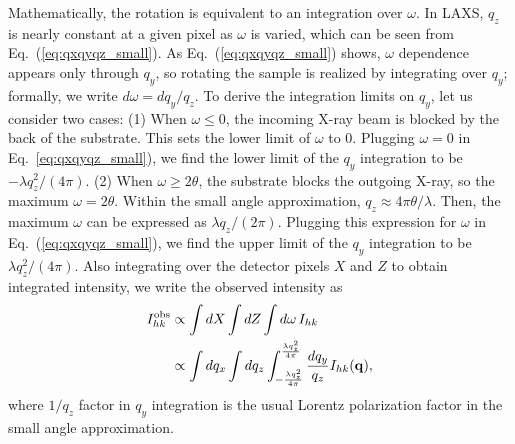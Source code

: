 Mathematically, the rotation is  
equivalent to an integration over $\omega$. In LAXS, 
$q_z$ is nearly constant at a given pixel as $\omega$ is varied, 
which can be seen from 
Eq.~(\ref{eq:qxqyqz_small}). As Eq.~(\ref{eq:qxqyqz_small}) shows, 
$\omega$ dependence appears only through $q_y$, 
so rotating the sample is realized by integrating over $q_y$;
formally, we write $d\omega=dq_y/q_z$.
To derive the integration limits on $q_y$, let us consider two cases: 
(1) When $\omega \leq 0$,
the incoming X-ray beam is blocked by the back of the substrate. This sets 
the lower limit of $\omega$ to 0. Plugging $\omega=0$ in Eq.~\ref{eq:qxqyqz_small}),
we find the lower limit of the $q_y$ integration to be $-\lambda q_z^2/(4\pi)$.
(2) When $\omega \geq 2\theta$, the substrate blocks 
the outgoing X-ray, so the maximum $\omega = 2\theta$. 
Within the small angle approximation, $q_z \approx 4\pi\theta/\lambda$. 
Then, the maximum $\omega$ can be expressed as $\lambda q_z/(2\pi)$.
Plugging this expression for $\omega$ in Eq.~(\ref{eq:qxqyqz_small}),
we find the upper limit of the $q_y$ integration to be $\lambda q_z^2/(4\pi)$.
Also integrating over the detector pixels $X$ and $Z$ to obtain integrated intensity, 
we write the observed intensity as
\begin{align}
  I_{hk}^\textrm{obs} 
    &\propto \int dX \int dZ \int \mathop{d\omega} I_{hk} \nonumber \\
    &\propto \int dq_x \int dq_z 
             \int_{-\frac{\lambda q_z^2}{4\pi}}^{\frac{\lambda q_z^2}{4\pi}} 
             \frac{dq_y}{q_z} 
             I_{hk}(\mathbf{q}),
  \label{eq:I_obs_general}
\end{align}
where $1/q_z$ factor in $q_y$ integration is the usual Lorentz polarization factor
in the small angle approximation. 

